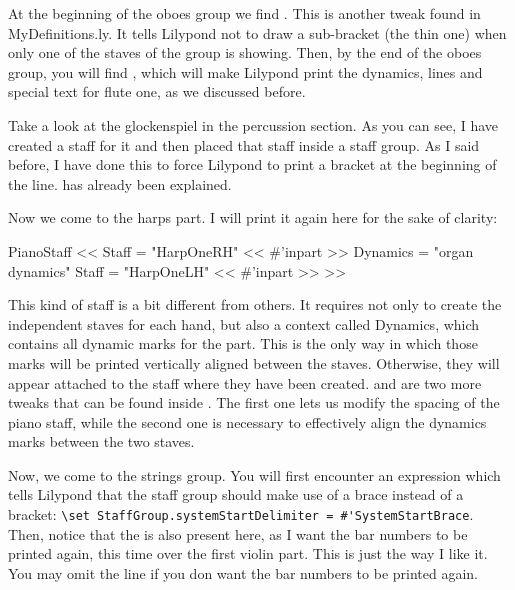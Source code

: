 \documentclass[../../LilyPond-Tutorials]{subfiles}
\begin{document}
At the beginning of the oboes group we find .
This is another tweak found in MyDefinitions.ly.
It tells Lilypond not to draw a sub-bracket (the thin one) when only one of the staves of the group is showing.
Then, by the end of the oboes group, you will find , which will make Lilypond print the dynamics, lines and special text for flute one, as we discussed before.

Take a look at the glockenspiel in the percussion section.
As you can see, I have created a staff for it and then placed that staff inside a staff group. 
As I said before, I have done this to force Lilypond to print a bracket at the beginning of the line.
 has already been explained.

Now we come to the harps part.
I will print it again here for the sake of clarity:

\begin{lilypondcode}
\new PianoStaff \with { \HarpsHeading \KeyboardStaffSpacing } <<
       \new Staff = "HarpOneRH" \with { 
              \ShowEmptyStaves } << 
              \removeWithTag #'inpart { \killCues { \HarpOneRH } } >>
       \new Dynamics = "organ dynamics" 
              { \KeyboardCenteredDynamics \HarpOneDynamics }
       \new Staff = "HarpOneLH" \with { 
              \ShowEmptyStaves } << 
              \removeWithTag #'inpart { \killCues { \HarpOneLH } } >>
>> %
\end{lilypondcode}

This kind of staff is a bit different from others.
It requires not only to create the independent staves for each hand, but also a context called Dynamics, which contains all dynamic marks for the part.
This is the only way in which those marks will be printed vertically aligned between the staves.
Otherwise, they will appear attached to the staff where they have been created.
 and  are two more tweaks that can be found inside .
The first one lets us modify the spacing of the piano staff, while the second one is necessary to effectively align the dynamics marks between the two staves.

Now, we come to the strings group.
You will first encounter an expression which tells Lilypond that the staff group should make use of a brace instead of a bracket: \verb|\set StaffGroup.systemStartDelimiter = #'SystemStartBrace|.
Then, notice that the  is also present here, as I want the bar numbers to be printed again, this time over the first violin part.
This is just the way I like it.
You may omit the line if you don want the bar numbers to be printed again.
\end{document}
